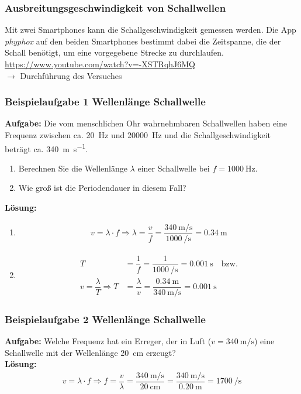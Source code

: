\documentclass{beamer}
\begin{document}
\frame
{
  \frametitle{Ausbreitungsgeschwindigkeit von Schallwellen}
	Mit zwei Smartphones kann die Schallgeschwindigkeit gemessen werden. Die App \textit{phyphox} auf den beiden Smartphones bestimmt dabei die Zeitspanne, die der Schall benötigt, um eine vorgegebene Strecke zu durchlaufen.\\
\url{https://www.youtube.com/watch?v=-XSTRqhJ6MQ}\\
$\rightarrow$ Durchführung des Versuches
}

\frame
{
\frametitle{Beispielaufgabe 1 Wellenlänge Schallwelle}
\textbf{Aufgabe:} Die vom menschlichen Ohr wahrnehmbaren Schallwellen haben eine Frequenz zwischen ca. \SI{20}{\hertz} und \SI{20000}{\hertz} und die Schallgeschwindigkeit beträgt ca. \SI{340}{\meter\per\second}.\\
\begin{enumerate}
	\item Berechnen Sie die Wellenlänge $\lambda$ einer Schallwelle bei $f=\SI{1000}{\hertz}$.
	\item Wie groß ist die Periodendauer in diesem Fall?
\end{enumerate}
}
\frame
{
\textbf{Lösung:}
\begin{enumerate}
\item 
	\begin{align*}
	v=\lambda\cdot f\Rightarrow\lambda=\dfrac{v}{f}=\dfrac{\SI{340}{\meter\per\second}}{\SI{1000}{\per\second}}=\SI{0,34}{\meter}
	\end{align*}
	\newpage
\item
	\begin{align*}
	T&=\dfrac{1}{f}=\dfrac{1}{\SI{1000}{\per\second}}=\SI{0,001}{\second}\quad\text{bzw.}\\
	v=\dfrac{\lambda}{T}\Rightarrow T&=\dfrac{\lambda}{v}=\dfrac{\SI{0,34}{\meter}}{\SI{340}{\meter\per\second}}=\SI{0,001}{\second}
	\end{align*}
\end{enumerate}
}

\frame
{
\frametitle{Beispielaufgabe 2 Wellenlänge Schallwelle}
{
\textbf{Aufgabe:} Welche Frequenz hat ein Erreger, der in Luft ($v=\SI{340}{\meter\per\second}$) eine Schallwelle mit der Wellenlänge \SI{20}{\centi\meter} erzeugt?\\
}
{
\textbf{Lösung:}
\begin{align*}
v=\lambda\cdot f\Rightarrow f=\dfrac{v}{\lambda}=\dfrac{\SI{340}{\meter\per\second}}{\SI{20}{\centi\meter}}=\dfrac{\SI{340}{\meter\per\second}}{\SI{0,20}{\meter}}=\SI{1700}{\per\second}
\end{align*}
}
}
\end{document}
